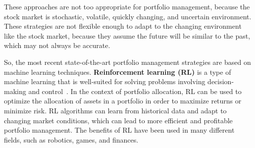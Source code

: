 These approaches are not too appropriate for portfolio management, because the stock market is stochastic, volatile, quickly changing, and uncertain environment.
These strategies are not flexible enough to adapt to the changing environment like the stock market, because they assume the future will be similar to the past, which may not always be accurate.

So, the most recent state-of-the-art portfolio management strategies are based on machine learning techniques.
\textbf{Reinforcement learning (RL)} is a type of machine learning that is well-suited for solving problems involving decision-making and control~\cite{sutton2018reinforcement}.
In the context of portfolio allocation, RL can be used to optimize the allocation of assets in a portfolio in order to maximize returns or minimize risk.
RL algorithms can learn from historical data and adapt to changing market conditions, which can lead to more efficient and profitable portfolio management.
The benefits of RL have been used in many different fields, such as robotics, games, and finances.

